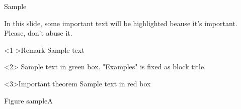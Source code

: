 \documentclass[10pt]{beamer}	%
\begin{document}
\begin{frame}[t]{Sample}{}
	
	In this slide, some important text will be
	\alert<2->{highlighted} beause it's important.
	Please, don't abuse it.
	
	\begin{block}<1->{Remark}
	Sample text
	\end{block}
	
	\begin{examples}
	Sample text in green box. "Examples" is fixed as block title.
	\end{examples}
	
	\begin{alertblock}{Important theorem}
	Sample text in red box
	\end{alertblock}
	
\end{frame}

\begin{frame}[c]{Figure sample}{A}
\end{frame}
\end{document}
